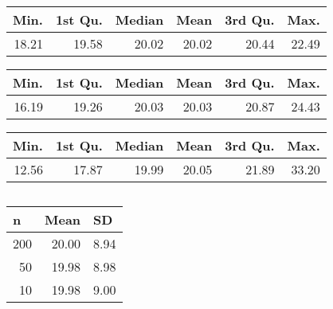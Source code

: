 \subsection{}

\begin{table}[!ht]	
\centering
\begin{tabular}{@{}rrrrrr@{}}
\toprule
Min.  & 1st Qu. & Median & Mean  & 3rd Qu. & Max.  \\ \midrule
18.21 & 19.58   & 20.02  & 20.02 & 20.44   & 22.49 \\ \bottomrule
\end{tabular}
\end{table}

\begin{table}[!ht]	
\centering
\begin{tabular}{@{}rrrrrr@{}}
\toprule
Min.  & 1st Qu. & Median & Mean  & 3rd Qu. & Max.  \\ \midrule
16.19 & 19.26   & 20.03  & 20.03 & 20.87   & 24.43 \\ \bottomrule
\end{tabular}
\end{table}

\begin{table}[!ht]	
\centering
\begin{tabular}{@{}rrrrrr@{}}
\toprule
Min.  & 1st Qu. & Median & Mean  & 3rd Qu. & Max.  \\ \midrule
12.56 & 17.87   & 19.99  & 20.05 & 21.89   & 33.20 \\ \bottomrule
\end{tabular}
\end{table}

\newpage

\subsection{}
\begin{table}[!ht]
\centering	
\begin{tabular}{@{}rrr@{}}
\toprule
\multicolumn{1}{l}{n} & \multicolumn{1}{l}{Mean} & \multicolumn{1}{l}{SD} \\ \midrule
200                   & 20.00                    & 8.94                   \\
50                    & 19.98                    & 8.98                   \\
10                    & 19.98                    & 9.00                   \\ \bottomrule
\end{tabular}
\end{table}

